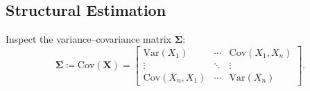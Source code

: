 
\subsection{Structural Estimation}
\label{sec:structural}

Inspect the variance--covariance matrix $\mathbfup{\Sigma}$:
\[
	\mathbfup{\Sigma} \coloneqq
	\mathup{Cov}(\mathbf{X}) =
	\begin{bmatrix}
		\mathup{Var}(X_1)      & \cdots & \mathup{Cov}(X_1, X_n) \\[-2.5pt]
		\vdots                 & \ddots & \vdots                 \\
		\mathup{Cov}(X_n, X_1) & \cdots & \mathup{Var}(X_n)
	\end{bmatrix}.
\]